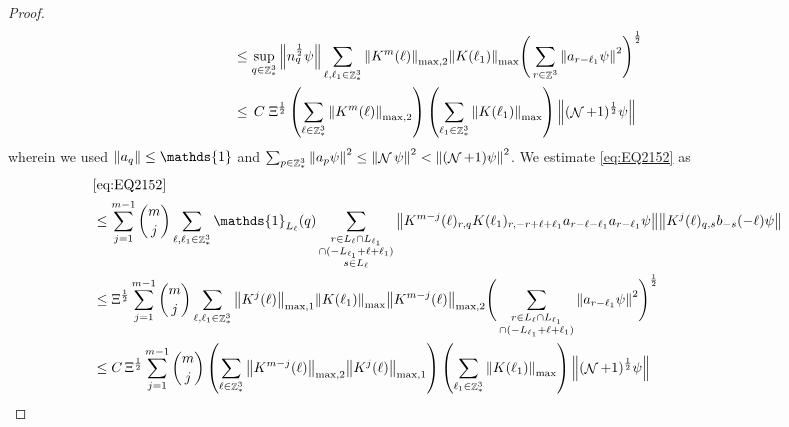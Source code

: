 \documentclass[sn-mathphys, Numbered ,a4paper]{sn-jnl}%
\DeclareMathOperator{\Z}{\mathbb{Z}}
\DeclareMathOperator{\NN}{\mathcal{N}}
\newcommand{\half}{\frac{1}{2}}
\theoremstyle{plain}
\theoremstyle{definition}
\theoremstyle{remark}
\theoremstyle{plain}
\theoremstyle{definition}
\theoremstyle{remark}
\begin{document}
\begin{proof}
\begin{align}
	&\leq \sup\limits_{q \in \Z^3_*} \norm{ n_{q}^\half \psi} \sum\limits_{\ell, \ell_1\in \Z^3_*} \norm{K^m(\ell)}_{\mathrm{max,2}} \norm{K(\ell_1)}_{\mathrm{max}} \Bigg( \sum\limits_{r\in \Z^3} \norm{  a_{r-\ell_1} \psi}^2\Bigg)^\half\nonumber\\    	
	&\leq \,C\; \Xi^\half \left(\sum\limits_{\ell \in \Z^3_*} \norm{K^m(\ell)}_{\mathrm{max,2}}\right)\left( \sum\limits_{\ell_1\in \Z^3_*} \norm{ K(\ell_1)}_{\mathrm{max}} \right) \norm{ (\NN+1)^\half \psi }\label{eq:estEQ2151}
\end{align} 
wherein we used $\norm{a_q} \leq \mathds{1}$ and $\sum_{p\in \Z^3_*}\norm{a_p \psi}^2\leq\norm{\NN\psi}^2<\norm{(\NN+1)\psi}^2$. We estimate \eqref{eq:EQ2152} as
\begin{align}
	&\eqref{eq:EQ2152}\nonumber\\
	&\leq  \sum\limits_{j=1}^{m-1} {{m}\choose j} \sum\limits_{\ell, \ell_1\in \Z^3_*}\mathds{1}_{L_{\ell}}(q) \sum\limits_{\substack{r\in L_{\ell} \cap L_{\ell_1}\\ \cap (-L_{\ell_1}+\ell+\ell_1)\\ s \in L_{\ell}}}  \norm{ K^{m-j}(\ell)_{r,q} K(\ell_1)_{r,-r+\ell+\ell_1}  a_{r-\ell-\ell_1} a_{r-\ell_1} \psi}\norm{ K^j(\ell)_{q,s}  b_{-s}(-\ell) \psi }\nonumber\\
	&\leq \Xi^\half \sum\limits_{j=1}^{m-1} {{m}\choose j} \sum\limits_{\ell, \ell_1\in \Z^3_*} \norm{K^{j}(\ell)}_{\mathrm{max,1}}  \norm{K(\ell_1)}_{\mathrm{max}} \norm{K^{m-j}(\ell)}_{\mathrm{max,2}} \Bigg(\sum\limits_{\substack{r\in L_{\ell} \cap L_{\ell_1}\\ \cap (-L_{\ell_1}+\ell+\ell_1)}} \norm{ a_{r-\ell_1} \psi}^2\Bigg)^\half\nonumber\\
	&\leq  C\,\Xi^\half  \sum\limits_{j=1}^{m-1} {{m}\choose j} \left( \sum\limits_{\ell \in \Z^3_*} \norm{K^{m-j}(\ell)}_{\mathrm{max,2}} \norm{ K^{j}(\ell)}_{\mathrm{max},1}\right) \left( \sum\limits_{ \ell_1\in \Z^3_*}\norm{ K(\ell_1) }_{\mathrm{max}} \right) \norm{ (\NN+1)^\half \psi }\label{eq:estEQ2152}
\end{align}
    

\end{proof}
\end{document}
